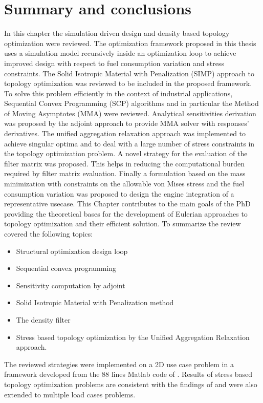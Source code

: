  \section{Summary and conclusions}
In this chapter the simulation driven design and density based topology optimization were reviewed. The optimization framework proposed in this thesis uses a simulation model recursively inside an optimization loop to achieve improved design with respect to fuel consumption variation and stress constraints. The Solid Isotropic Material with Penalization (SIMP) approach to topology optimization was reviewed to be included in the proposed framework. To solve this problem efficiently in the context of industrial applications, Sequential Convex Programming (SCP) algorithms and in particular the Method of Moving Asymptotes (MMA) were reviewed. Analytical sensitivities derivation was proposed by the adjoint approach to provide MMA solver with responses' derivatives. The unified aggregation relaxation approach was implemented to achieve singular optima and to deal with a large number of stress constraints in the topology optimization problem. A novel strategy for the evaluation of the filter matrix was proposed. This helps in reducing the computational burden required by filter matrix evaluation. Finally a formulation based on the mass minimization with constraints on the allowable von Mises stress and the fuel consumption variation was proposed to design the engine integration of a representative usecase.
This Chapter contributes to the main goals of the PhD providing the theoretical bases for the development of Eulerian approaches to topology optimization and their efficient solution.
To summarize the review covered the following topics:
\begin{itemize}
\item Structural optimization design loop
\item Sequential convex programming
\item Sensitivity computation by adjoint
\item Solid Isotropic Material with Penalization method
\item The density filter
\item Stress based topology optimization by the Unified Aggregation Relaxation approach.
\end{itemize}
The reviewed strategies were implemented on a 2D use case problem in a framework developed from the 88 lines Matlab code of \cite{andreassen2011efficient}. Results of stress based topology optimization problems are consistent with the findings of \cite{verbart2017unified} and were also extended to multiple load cases problems.

